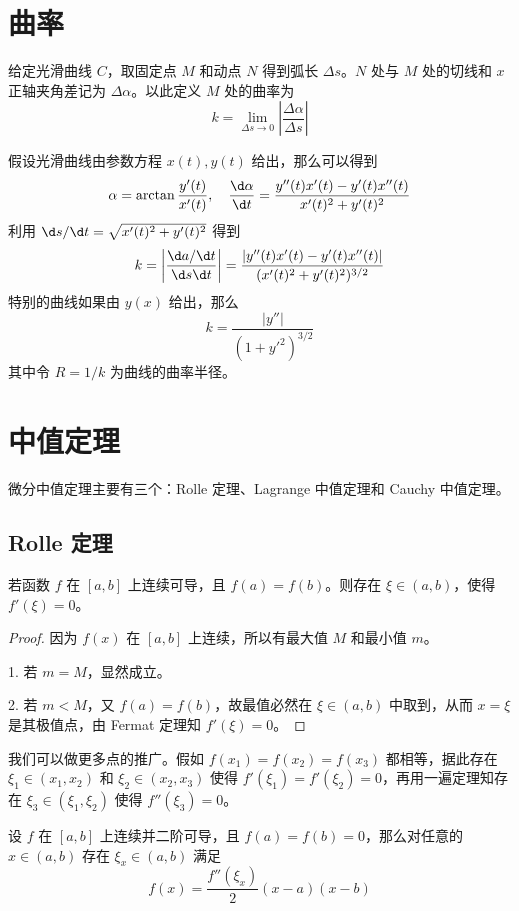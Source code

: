 \section{曲率}

给定光滑曲线 $C$，取固定点 $M$ 和动点 $N$ 得到弧长 $\Delta s$。$N$ 处与 $M$ 处的切线和 $x$ 正轴夹角差记为 $\Delta \alpha$。以此定义 $M$ 处的曲率为
\[ k = \lim_{\Delta s \to 0} \left| \frac{\Delta \alpha}{\Delta s} \right| \]

假设光滑曲线由参数方程 $x(t), y(t)$ 给出，那么可以得到
\[ \alpha = \arctan \frac{y'(t)}{x'(t)}, \quad \frac{\d \alpha}{\d t} = \frac{y''(t)x'(t) - y'(t) x''(t)}{x'(t)^2 + y'(t)^2} \]
利用 $\d s/ \d t = \sqrt{x'(t)^2 + y'(t)^2}$ 得到
\[ k = \left| \frac{\d a / \d t}{\d s \d t} \right| = \frac{|y''(t)x'(t) - y'(t) x''(t)|}{(x'(t)^2 + y'(t)^2)^{3/2}} \]
特别的曲线如果由 $y(x)$ 给出，那么
\[ k = \frac{|y''|}{(1+y'^2)^{3/2}} \]
其中令 $R = 1/k$ 为曲线的曲率半径。

\section{中值定理}

微分中值定理主要有三个：Rolle 定理、Lagrange 中值定理和 Cauchy 中值定理。

\subsection{Rolle 定理}

\begin{theorem}
	若函数 $f$ 在 $[a,b]$ 上连续可导，且 $f(a)=f(b)$。则存在 $\xi\in(a,b)$，使得 $f'(\xi)=0$。
\end{theorem}

\begin{proof}
	因为 $f(x)$ 在 $[a,b]$ 上连续，所以有最大值 $M$ 和最小值 $m$。

	1. 若 $m=M$，显然成立。

	2. 若 $m < M$，又 $f(a) = f(b)$，故最值必然在 $\xi \in (a, b)$ 中取到，从而 $x=\xi$ 是其极值点，由 Fermat 定理知 $f'(\xi) = 0$。
\end{proof}

我们可以做更多点的推广。假如 $f(x_1) = f(x_2) = f(x_3)$ 都相等，据此存在 $\xi_1 \in (x_1, x_2)$ 和 $\xi_2 \in (x_2, x_3)$ 使得 $f'(\xi_1) = f'(\xi_2) = 0$，再用一遍定理知存在 $\xi_3 \in (\xi_1, \xi_2)$ 使得 $f''(\xi_3) = 0$。

\begin{example}
	设 $f$ 在 $[a,b]$ 上连续并二阶可导，且 $f(a) = f(b) = 0$，那么对任意的 $x \in (a, b)$ 存在 $\xi_x \in (a,b)$ 满足
	\[ f(x) = \frac{f''(\xi_x)}{2}(x-a)(x-b) \]
\end{example}

